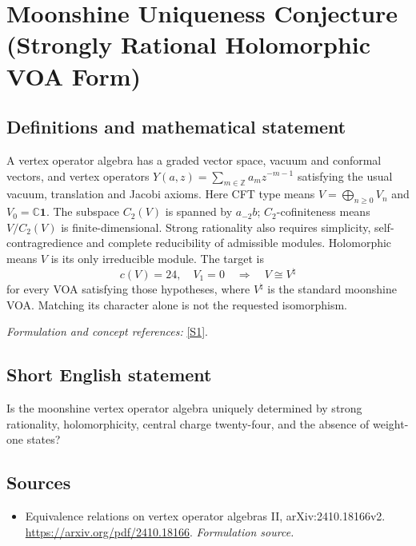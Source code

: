 \documentclass[11pt]{article}
\begin{document}
\section*{\texorpdfstring{Moonshine Uniqueness Conjecture (Strongly Rational Holomorphic VOA Form)}{Moonshine Uniqueness Conjecture (Strongly Rational Holomorphic VOA Form)}}\label{statement}
\subsection{Definitions and mathematical statement}
A vertex operator algebra has a graded vector space, vacuum and conformal vectors, and vertex operators $Y(a,z)=\sum_{m\in{\mathbb{Z}}}a_mz^{-m-1}$ satisfying the usual vacuum, translation and Jacobi axioms. Here CFT type means $V=\bigoplus_{n\ge0}V_n$ and $V_0={\mathbb{C}}\mathbf1$. The subspace $C_2(V)$ is spanned by $a_{-2}b$; $C_2$-cofiniteness means $V/C_2(V)$ is finite-dimensional. Strong rationality also requires simplicity, self-contragredience and complete reducibility of admissible modules. Holomorphic means $V$ is its only irreducible module. The target is
\[
 c(V)=24,\quad V_1=0\quad\Longrightarrow\quad V\cong V^{\natural}
\]
for every VOA satisfying those hypotheses, where $V^{\natural}$ is the standard moonshine VOA. Matching its character alone is not the requested isomorphism.
\par\smallskip\textit{Formulation and concept references:} \href{https://arxiv.org/pdf/2410.18166}{[S1]}.

\subsection{Short English statement}
Is the moonshine vertex operator algebra uniquely determined by strong rationality, holomorphicity, central charge twenty-four, and the absence of weight-one states?
\subsection{Sources}
\begin{itemize}
\item[S1]Equivalence relations on vertex operator algebras II, arXiv:2410.18166v2.
\url{https://arxiv.org/pdf/2410.18166}.
\textit{Formulation source.}
\end{itemize}
\end{document}
